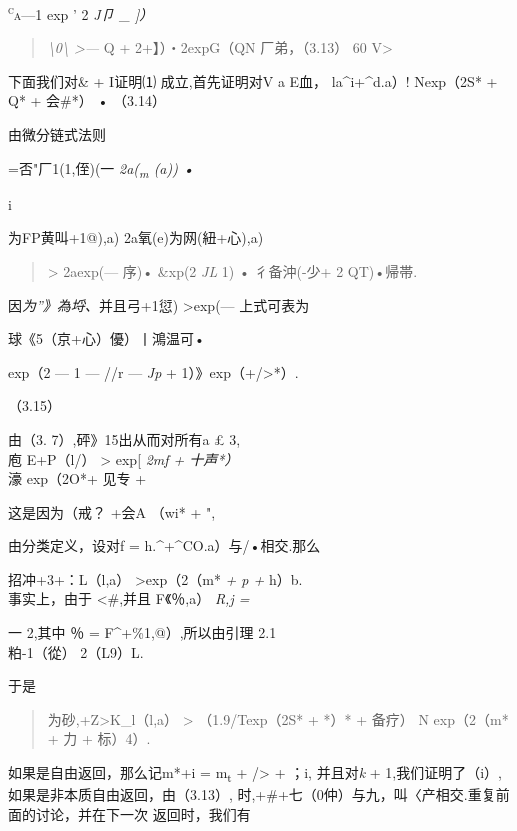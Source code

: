 \documentclass{article}
\begin{document}
\textsc{\textsuperscript{c}a---}1 exp ' 2 \emph{J卩 \_ {]}）}

\begin{quote}
\emph{\textbackslash{}0\textbackslash{} \textgreater{}---} Q +
2+】）・2expG（QN 厂弟，（3.13） 60 V\textgreater{}
\end{quote}

下面我们对\& + I证明⑴ 成立,首先证明对V a E血， la\^{}i+\^{}d.a）!
Nexp（2S* + Q* + 会\#*） • （3.14）

由微分链式法则

=否"厂1(1,侄)(一 \emph{2a(\textsubscript{m} (a)) •}

i

为FP黄叫+1@),a) \textbar{}2a氧(e)为网(紐+心),a) \textbar{}

\begin{quote}
\textgreater{} 2aexp(--- 序)• \&xp(2 \emph{JL} 1) • 彳备沖(-少+ 2
QT)•帰帯.
\end{quote}

因\emph{为''》為埒、}并且\textbar{}弓+1愆)\textbar{}
\textgreater{}exp(--- 上式可表为

\textbar{}球《5（京+心）優）丨鴻温可•

exp（2 --- 1 --- //r --- \emph{Jp} + 1）》exp（+/\textgreater{}*）.

（3.15）

由（3. 7）,砰》15出从而对所有a £ 3,\\
庖 E+P（l/）\textbar{} \textgreater{} exp{[} \emph{2mf + 十声*）\\
}濠 exp（2O*+ 见专 +

这是因为（戒？ +会A （wi* + ",

由分类定义，设对f = h.\^{}+\^{}CO.a）与/•相交.那么

\textbar{}招冲+3+：L（l,a） \textbar{} \textgreater{}exp（2（m* \emph{+
p +} h）b.\\
事实上，由于 \textless{}\#,并且 \textbar{}F《％,a）\textbar{} \emph{R,j
=}

一 2,其中 ％ = F\^{}+\%1,@）,所以由引理 2.1\\
\textbar{}粕-1（從）\textbar{} 2（L9）L.

于是

\begin{quote}
\textbar{}为砂,+Z\textgreater{}K\_l（l,a）\textbar{} \textgreater{}
（1.9/Texp（2S* + *）* + 备疗） N exp（2（m* + 力 + 标）4）.
\end{quote}

如果是自由返回，那么记m*+i = m\textsubscript{t} + /\textgreater{} + ；i,
并且对\emph{k} + 1,我们证明了（i）,如果是非本质自由返回，由（3.13）,
时,+\#+七（0仲）与九，\textbar{}叫〈产相交.重复前面的讨论，并在下一次
返回时，我们有
\end{document}
